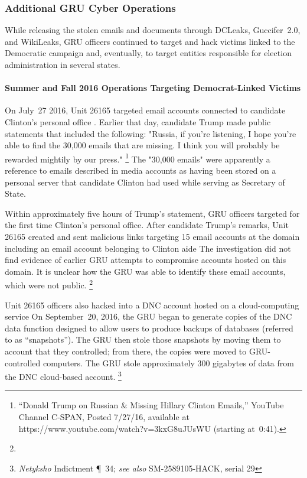 \subsubsection{Additional GRU Cyber Operations}

While releasing the stolen emails and documents through DCLeaks, Guccifer~2.0, and WikiLeaks, GRU officers continued to target and hack victims linked to the Democratic campaign and, eventually, to target entities responsible for election administration in several states.

\paragraph{Summer and Fall 2016 Operations Targeting Democrat-Linked Victims}

On July~27 2016, Unit 26165 targeted email accounts connected to candidate Clinton's personal office .
Earlier that day, candidate Trump made public statements that included the following: "Russia, if you're listening, I hope you're able to find the 30,000 emails that are missing.
I think you will probably be rewarded mightily by our press."%
\footnote{``Donald Trump on Russian \& Missing Hillary Clinton Emails,'' YouTube Channel C-SPAN, Posted 7/27/16, available at https://www.youtube.com/watch?v=3kxG8uJUsWU (starting at~0:41).}
The "30,000 emails" were apparently a reference to emails described in media accounts as having been stored on a personal server that candidate Clinton had used while serving as Secretary of State.

Within approximately five hours of Trump's statement, GRU officers targeted for the first time Clinton's personal office.
After candidate Trump's remarks, Unit 26165 created and sent malicious links targeting 15 email accounts at the domain  including an email account belonging to Clinton aide 
The investigation did not find evidence of earlier GRU attempts to compromise accounts hosted on this domain.
It is unclear how the GRU was able to identify these email accounts, which were not public.%
\footnote{}

Unit 26165 officers also hacked into a DNC account hosted on a cloud-computing service 
On September~20, 2016, the GRU began to generate copies of the DNC data  function designed to allow users to produce backups of databases (referred to  as ``snapshots'').
The GRU then stole those snapshots by moving them to  account that they controlled; from there, the copies were moved to GRU-controlled computers.
The GRU stole approximately 300 gigabytes of data from the DNC cloud-based account.%
\footnote{\textit{Netyksho} Indictment \P~34;
\textit{see also} SM-2589105-HACK, serial 29 }

